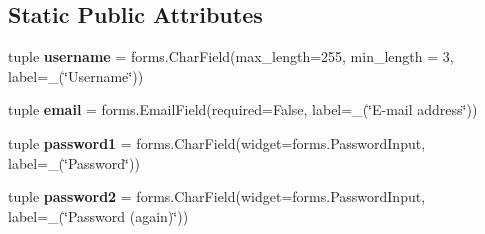 \subsection*{Static Public Attributes}
\begin{DoxyCompactItemize}
\item 
\hypertarget{classsouvenir_1_1userprofile_1_1forms_1_1RegistrationForm_a1bf0f2e3de80628873b16eae01698955}{tuple {\bfseries username} = forms.\-Char\-Field(max\-\_\-length=255, min\-\_\-length = 3, label=\-\_\-(\char`\"{}Username\char`\"{}))}\label{classsouvenir_1_1userprofile_1_1forms_1_1RegistrationForm_a1bf0f2e3de80628873b16eae01698955}

\item 
\hypertarget{classsouvenir_1_1userprofile_1_1forms_1_1RegistrationForm_a04cecebed693581ed4efe9e40c57b5e3}{tuple {\bfseries email} = forms.\-Email\-Field(required=False, label=\-\_\-(\char`\"{}E-\/mail address\char`\"{}))}\label{classsouvenir_1_1userprofile_1_1forms_1_1RegistrationForm_a04cecebed693581ed4efe9e40c57b5e3}

\item 
\hypertarget{classsouvenir_1_1userprofile_1_1forms_1_1RegistrationForm_aa827f369b19715936fc0341b3df481f1}{tuple {\bfseries password1} = forms.\-Char\-Field(widget=forms.\-Password\-Input, label=\-\_\-(\char`\"{}Password\char`\"{}))}\label{classsouvenir_1_1userprofile_1_1forms_1_1RegistrationForm_aa827f369b19715936fc0341b3df481f1}

\item 
\hypertarget{classsouvenir_1_1userprofile_1_1forms_1_1RegistrationForm_a5cfbdd77d66a43aeea6413ab95a2c4cb}{tuple {\bfseries password2} = forms.\-Char\-Field(widget=forms.\-Password\-Input, label=\-\_\-(\char`\"{}Password (again)\char`\"{}))}\label{classsouvenir_1_1userprofile_1_1forms_1_1RegistrationForm_a5cfbdd77d66a43aeea6413ab95a2c4cb}

\end{DoxyCompactItemize}


